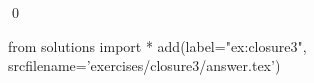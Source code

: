 
\begin{ex} 
  \label{ex:closure3}
  
  \qed
\end{ex} 
\begin{python0}
from solutions import *
add(label="ex:closure3",
    srcfilename='exercises/closure3/answer.tex') 
\end{python0}
